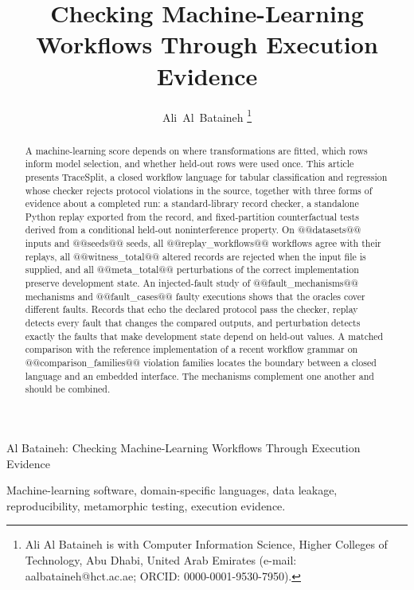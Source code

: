 \documentclass[lettersize,journal]{IEEEtran}
\newcommand{\tool}{TraceSplit}
\begin{document}
\title{Checking Machine-Learning Workflows Through Execution Evidence}
\author{Ali~Al~Bataineh%
\thanks{Ali Al Bataineh is with Computer Information Science, Higher Colleges of Technology, Abu Dhabi, United Arab Emirates (e-mail: aalbataineh@hct.ac.ae; ORCID: 0000-0001-9530-7950).}}

%
{Al Bataineh: Checking Machine-Learning Workflows Through Execution Evidence}

\maketitle

\begin{abstract}
A machine-learning score depends on where transformations are fitted, which rows inform model selection, and whether held-out rows were used once. This article presents \tool{}, a closed workflow language for tabular classification and regression whose checker rejects protocol violations in the source, together with three forms of evidence about a completed run: a standard-library record checker, a standalone Python replay exported from the record, and fixed-partition counterfactual tests derived from a conditional held-out noninterference property. On @@datasets@@ inputs and @@seeds@@ seeds, all @@replay_workflows@@ workflows agree with their replays, all @@witness_total@@ altered records are rejected when the input file is supplied, and all @@meta_total@@ perturbations of the correct implementation preserve development state. An injected-fault study of @@fault_mechanisms@@ mechanisms and @@fault_cases@@ faulty executions shows that the oracles cover different faults. Records that echo the declared protocol pass the checker, replay detects every fault that changes the compared outputs, and perturbation detects exactly the faults that make development state depend on held-out values. A matched comparison with the reference implementation of a recent workflow grammar on @@comparison_families@@ violation families locates the boundary between a closed language and an embedded interface. The mechanisms complement one another and should be combined.
\end{abstract}
\begin{IEEEkeywords}
Machine-learning software, domain-specific languages, data leakage, reproducibility, metamorphic testing, execution evidence.
\end{IEEEkeywords}
\end{document}
